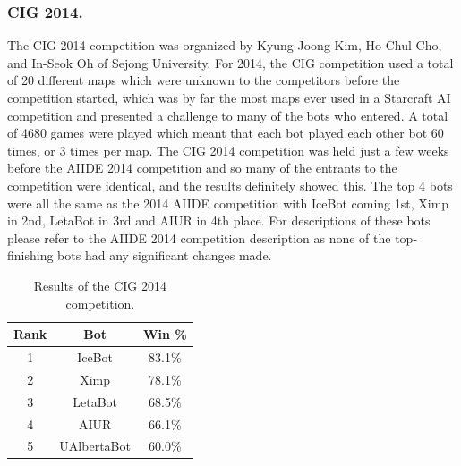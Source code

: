 \documentclass{llncs}
\begin{document}
\subsubsection{CIG 2014.}
The CIG 2014 competition was organized by Kyung-Joong Kim, Ho-Chul Cho, and In-Seok Oh of Sejong University. For 2014, the CIG competition used a total of 20 different maps which were unknown to the competitors before the competition started, which was by far the most maps ever used in a Starcraft AI competition and presented a challenge to many of the bots who entered. A total of 4680 games were played which meant that each bot played each other bot 60 times, or 3 times per map. The CIG 2014 competition was held just a few weeks before the AIIDE 2014 competition and so many of the entrants to the competition were identical, and the results definitely showed this. The top 4 bots were all the same as the 2014 AIIDE competition with IceBot coming 1st, Ximp in 2nd, LetaBot in 3rd and AIUR in 4th place. For descriptions of these bots please refer to the AIIDE 2014 competition description as none of the top-finishing bots had any significant changes made.

\begin{table}[t]
\caption{Results of the CIG 2014 competition.}
\label{tab:cig2014}
\centering
\begin{tabular}{|c|c|c|}
\hline
{\bfseries Rank} & {\bfseries Bot} & {\bfseries Win \%} \\
\hline
1 & IceBot & 83.1\% \\
2 & Ximp & 78.1\% \\
3 & LetaBot & 68.5\% \\
4 & AIUR & 66.1\% \\
5 & UAlbertaBot & 60.0\% \\ 
\hline
\end{tabular}
\end{table}
\end{document}
